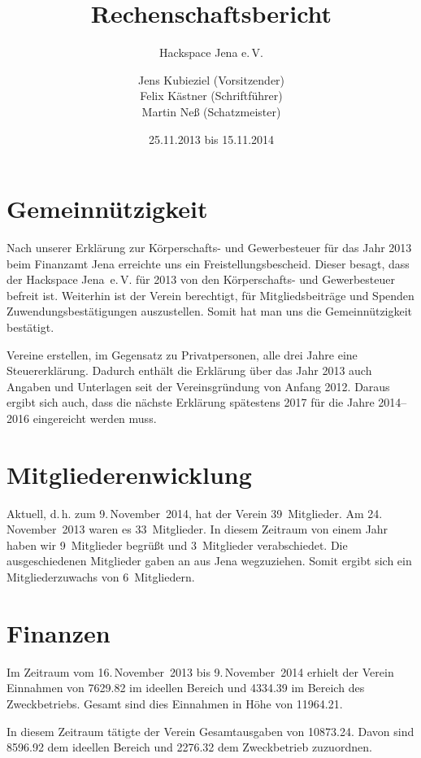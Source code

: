 \documentclass[ngerman,10pt,DIV16]{scrartcl}
\title{Rechenschaftsbericht}
\subtitle{Hackspace Jena e.\,V.}
\author{%
	Jens Kubieziel (Vorsitzender)\\
    Felix Kästner (Schriftführer)\\
	Martin Neß (Schatzmeister)
}
\date{25.11.2013 bis 15.11.2014}
\begin{document}
\maketitle{}

\tableofcontents{}

\newpage{}

\section{Gemeinnützigkeit}

Nach unserer Erklärung zur Körperschafts- und Gewerbesteuer für das Jahr 2013 beim Finanzamt Jena
erreichte uns ein Freistellungsbescheid.
Dieser besagt, dass der Hackspace Jena~e.\,V. für 2013 von den Körperschafts- und Gewerbesteuer befreit ist. Weiterhin ist der Verein berechtigt, für Mitgliedsbeiträge und Spenden Zuwendungsbestätigungen auszustellen.
Somit hat man uns die Gemeinnützigkeit bestätigt.

Vereine erstellen, im Gegensatz zu Privatpersonen, alle drei Jahre eine Steuererklärung.
Dadurch enthält die Erklärung über das Jahr 2013 auch Angaben und Unterlagen seit der Vereinsgründung von Anfang 2012.
Daraus ergibt sich auch, dass die nächste Erklärung spätestens 2017 für die Jahre 2014--2016 eingereicht werden muss.

\section{Mitgliederenwicklung}

Aktuell, d.\,h. zum 9.\,November~2014, hat der Verein 39~Mitglieder. Am 24.\,November~2013 waren es 33~Mitglieder.
In diesem Zeitraum von einem Jahr haben wir 9~Mitglieder begrüßt und 3~Mitglieder verabschiedet. Die ausgeschiedenen Mitglieder gaben an aus Jena wegzuziehen.
Somit ergibt sich ein Mitgliederzuwachs von 6~Mitgliedern.

\section{Finanzen}

Im Zeitraum vom 16.\,November~2013 bis 9.\,November~2014 erhielt der Verein Einnahmen von \SI{7629,82}{\EUR} im ideellen Bereich und \SI{4334,39}{\EUR} im Bereich des Zweckbetriebs.
Gesamt sind dies Einnahmen in Höhe von \SI{11964,21}{\EUR}.


In diesem Zeitraum tätigte der Verein Gesamtausgaben von \SI{10873,24}{\EUR}. Davon sind \SI{8596,92}{\EUR} dem ideellen Bereich und \SI{2276,32}{\EUR}  dem Zweckbetrieb zuzuordnen.
\end{document}
